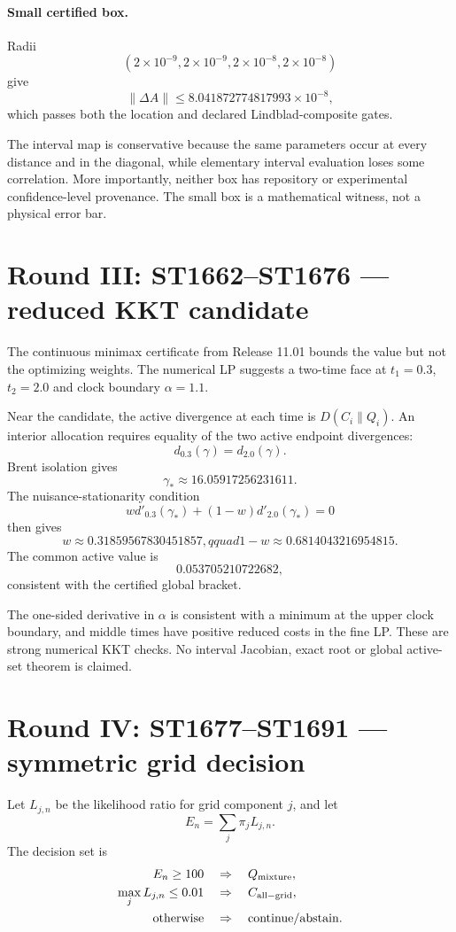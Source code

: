 \documentclass[11pt,a4paper]{article}
\begin{document}
\paragraph{Small certified box.}
Radii
\[
(2\times10^{-9},2\times10^{-9},2\times10^{-8},2\times10^{-8})
\]
give
\[
\|\Delta A\|\le8.041872774817993\times10^{-8},
\]
which passes both the location and declared Lindblad-composite gates.

The interval map is conservative because the same parameters occur at every
distance and in the diagonal, while elementary interval evaluation loses some
correlation.  More importantly, neither box has repository or experimental
confidence-level provenance.  The small box is a mathematical witness, not a
physical error bar.

\section{Round III: ST1662--ST1676 --- reduced KKT candidate}

The continuous minimax certificate from Release 11.01 bounds the value but not
the optimizing weights.  The numerical LP suggests a two-time face at
$t_1=0.3$, $t_2=2.0$ and clock boundary $\alpha=1.1$.

Near the candidate, the active divergence at each time is
$D(C_i\|Q_i)$.  An interior allocation requires equality of the two active
endpoint divergences:
\[
d_{0.3}(\gamma)=d_{2.0}(\gamma).
\]
Brent isolation gives
\[
\gamma_*\approx16.05917256231611.
\]
The nuisance-stationarity condition
\[
w d'_{0.3}(\gamma_*)+(1-w)d'_{2.0}(\gamma_*)=0
\]
then gives
\[
w\approx0.31859567830451857,qquad1-w\approx0.6814043216954815.
\]
The common active value is
\[
0.053705210722682,
\]
consistent with the certified global bracket.

The one-sided derivative in $\alpha$ is consistent with a minimum at the upper
clock boundary, and middle times have positive reduced costs in the fine LP.
These are strong numerical KKT checks.  No interval Jacobian, exact root or
global active-set theorem is claimed.

\section{Round IV: ST1677--ST1691 --- symmetric grid decision}

Let $L_{j,n}$ be the likelihood ratio for grid component $j$, and let
\[
E_n=\sum_j\pi_jL_{j,n}.
\]
The decision set is
\begin{align*}
E_n\ge100 &\quad\Rightarrow\quad Q_{\rm mixture},\\
\max_jL_{j,n}\le0.01 &\quad\Rightarrow\quad C_{\rm all-grid},\\
\text{otherwise} &\quad\Rightarrow\quad \text{continue/abstain}.
\end{align*}
\end{document}
